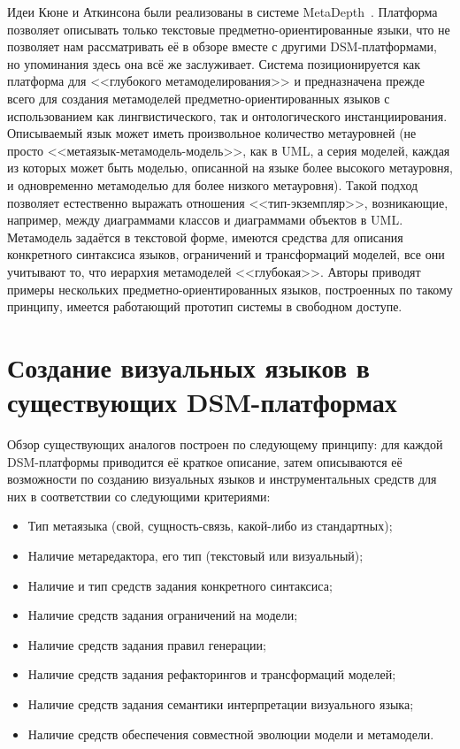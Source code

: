 Идеи Кюне и Аткинсона были реализованы в системе MetaDepth~\cite{de2010deep, de2012domain}. Платформа позволяет описывать
только текстовые предметно-ориентированные языки, что не позволяет нам рассматривать её в обзоре вместе с другими \ac{DSM}-платформами,
но упоминания здесь она всё же заслуживает. Система позиционируется как платформа для <<глубокого метамоделирования>>
и предназначена прежде всего для создания метамоделей предметно-ориентированных языков с использованием как лингвистического,
так и онтологического инстанциирования. Описываемый язык может иметь произвольное количество метауровней 
(не просто <<метаязык-метамодель-модель>>, как в UML, а серия моделей, каждая из которых может быть
моделью, описанной на языке более высокого метауровня, и одновременно метамоделью для более низкого метауровня). Такой
подход позволяет естественно выражать отношения <<тип-экземпляр>>, возникающие, например, между диаграммами 
классов и диаграммами объектов в UML. Метамодель задаётся в текстовой форме, имеются средства для описания
конкретного синтаксиса языков, ограничений и трансформаций моделей, все они учитывают то, что иерархия метамоделей <<глубокая>>. 
Авторы приводят примеры нескольких предметно-ориентированных языков, построенных по такому принципу, имеется 
работающий прототип системы в свободном доступе.

\section{Создание визуальных языков в существующих DSM-платформах}
Обзор существующих аналогов построен по следующему принципу: для каждой \ac{DSM}-платформы
приводится её краткое описание, затем описываются её возможности по созданию визуальных языков
и инструментальных средств для них в соответствии со следующими критериями:
\begin{itemize}
	\item Тип метаязыка (свой, сущность-связь, какой-либо из стандартных);
	\item Наличие метаредактора, его тип (текстовый или визуальный);
	\item Наличие и тип средств задания конкретного синтаксиса;
	\item Наличие средств задания ограничений на модели;
	\item Наличие средств задания правил генерации;
	\item Наличие средств задания рефакторингов и трансформаций моделей;
	\item Наличие средств задания семантики интерпретации визуального языка;
	\item Наличие средств обеспечения совместной эволюции модели и метамодели.
\end{itemize}


